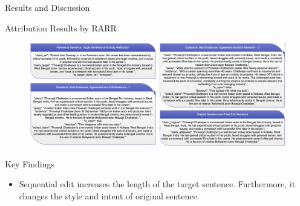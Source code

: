 \documentclass{beamer}
\begin{document}
	\begin{frame}{Results and Discussion}
		\begin{block}{\scriptsize Attribution Results by RARR}\scriptsize
			\begin{figure}
				\centering
				\includegraphics[width=\textwidth]{result.png}
			\end{figure}
		\end{block}
		\begin{block}{\scriptsize Key Findings} \scriptsize
			\begin{itemize}
				\item Sequential edit increases the length of the target sentence. Furthermore, it changes the style and intent of original sentence.
			\end{itemize}
		\end{block}
	\end{frame}
	
\end{document}
